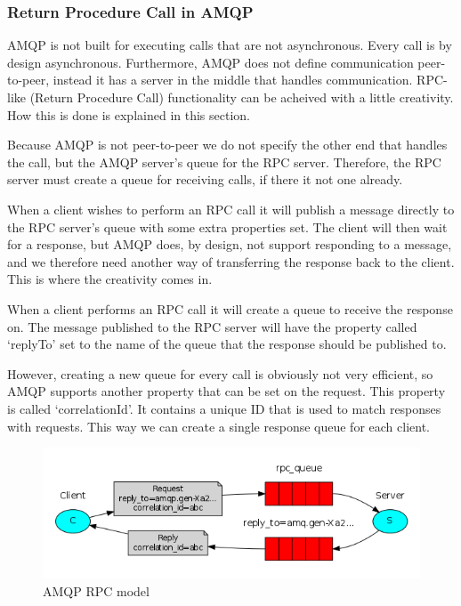 \subsubsection{Return Procedure Call in AMQP}
AMQP is not built for executing calls that are not asynchronous. Every call is by design asynchronous. Furthermore, AMQP does not define communication peer-to-peer, instead it has a server in the middle that handles communication. RPC-like (Return Procedure Call) functionality can be acheived with a little creativity. How this is done is explained in this section.

Because AMQP is not peer-to-peer we do not specify the other end that handles the call, but the AMQP server's queue for the RPC server. Therefore, the RPC server must create a queue for receiving calls, if there it not one already.

When a client wishes to perform an RPC call it will publish a message directly to the RPC server's queue with some extra properties set. The client will then wait for a response, but AMQP does, by design, not support responding to a message, and we therefore need another way of transferring the response back to the client. This is where the creativity comes in.

When a client performs an RPC call it will create a queue to receive the response on. The message published to the RPC server will have the property called `replyTo' set to the name of the queue that the response should be published to.

However, creating a new queue for every call is obviously not very efficient, so AMQP supports another property that can be set on the request. This property is called `correlationId'. It contains a unique ID that is used to match responses with requests. This way we can create a single response queue for each client.

\begin{figure}[H]
  \includegraphics[width=\textwidth]{illustrations/amqp-rpc.png}
  \caption{AMQP RPC model\cite{AMQPRPC}}
\end{figure}

\label{subsubsec:AMQPRPC}
\newpage
